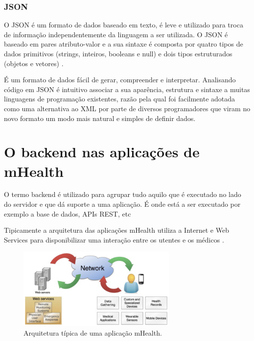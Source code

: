 \subsubsection{JSON}

O \gls{JSON} é um formato de dados baseado em texto, é leve e utilizado para troca de informação independentemente da linguagem a ser utilizada. O \gls{JSON} é baseado em pares atributo-valor e a sua sintaxe é composta por quatro tipos de dados primitivos (strings, inteiros, booleans e null) e dois tipos estruturados (objetos e vetores) \cite{json}. 
\par
É um formato de dados  fácil de gerar, compreender e interpretar. Analisando código em \gls{JSON} é intuitivo associar a sua aparência, estrutura e sintaxe a muitas linguagens de programação existentes, razão pela qual foi facilmente adotada como uma alternativa ao \gls{XML} por parte de diversos programadores que viram no novo formato um modo mais natural e simples de definir dados.

\section{O backend nas aplicações de mHealth}
O termo backend é utilizado para agrupar tudo aquilo que é executado no lado do servidor e que dá suporte a uma aplicação. É onde está a ser executado por exemplo a base de dados, \gls{API}s \gls{REST}, etc 

Tipicamente a arquitetura das aplica\c c\~oes mHealth utiliza a Internet e Web Services para disponibilizar uma intera\c c\~ao entre os utentes e os m\'edicos \cite{mhealth}.

\begin{figure}[H]
  \centering
  \includegraphics[width=0.7\textwidth]{imgs/mHealthArch.png}
  \caption[Arquitetura t\'ipica de uma  aplica\c c\~ao mHealth]{Arquitetura t\'ipica de uma  aplica\c c\~ao mHealth. \cite{mhealth}}
  
  \label{f:mhealtharch}
\end{figure}


